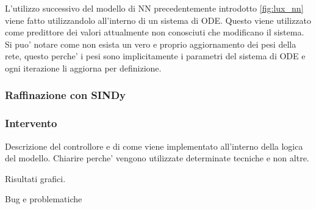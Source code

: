 L'utilizzo successivo del modello di NN precedentemente introdotto \ref{fig:lux_nn} viene fatto 
utilizzandolo all'interno di un sistema di ODE. Questo viene utilizzato come predittore 
dei valori attualmente non conosciuti che modificano il sistema. Si puo' notare come non esista un 
vero e proprio aggiornamento dei pesi della rete, questo perche' i pesi sono implicitamente i parametri
del sistema di ODE e ogni iterazione li aggiorna per definizione.

\subsubsection*{Raffinazione con SINDy}

\subsubsection{Intervento}

Descrizione del controllore e di come viene implementato all'interno
della logica del modello. Chiarire perche' vengono utilizzate
determinate tecniche e non altre. 

Risultati grafici.

Bug e problematiche